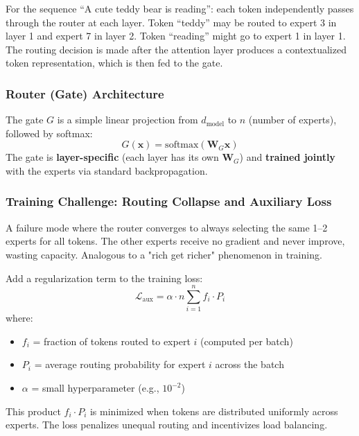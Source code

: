 \documentclass[11pt, a4paper]{article}
\begin{document}
\begin{exbox}
For the sequence ``A cute teddy bear is reading'': each token independently passes through the router at each layer. Token ``teddy'' may be routed to expert 3 in layer 1 and expert 7 in layer 2. Token ``reading'' might go to expert 1 in layer 1. The routing decision is made after the attention layer produces a contextualized token representation, which is then fed to the gate.
\end{exbox}

\subsubsection{Router (Gate) Architecture}

The gate $G$ is a simple linear projection from $d_{\text{model}}$ to $n$ (number of experts), followed by softmax:
\[
G(\mathbf{x}) = \text{softmax}(\mathbf{W}_G \mathbf{x})
\]
The gate is \textbf{layer-specific} (each layer has its own $\mathbf{W}_G$) and \textbf{trained jointly} with the experts via standard backpropagation.

\subsubsection{Training Challenge: Routing Collapse and Auxiliary Loss}

\begin{defbox}
A failure mode where the router converges to always selecting the same 1--2 experts for all tokens. The other experts receive no gradient and never improve, wasting capacity. Analogous to a "rich get richer" phenomenon in training.
\end{defbox}

\begin{mathbox}
Add a regularization term to the training loss:
\[
\mathcal{L}_{\text{aux}} = \alpha \cdot n \sum_{i=1}^{n} f_i \cdot P_i
\]
where:
\begin{itemize}[leftmargin=1.5em]
  \item $f_i$ = fraction of tokens routed to expert $i$ (computed per batch)
  \item $P_i$ = average routing probability for expert $i$ across the batch
  \item $\alpha$ = small hyperparameter (e.g., $10^{-2}$)
\end{itemize}
This product $f_i \cdot P_i$ is minimized when tokens are distributed uniformly across experts. The loss penalizes unequal routing and incentivizes load balancing.
\end{mathbox}
\end{document}
